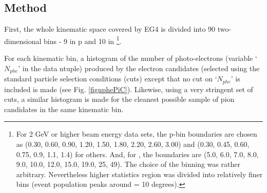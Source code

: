 \subsection{Method}
First, %
the whole kinematic space covered by EG4 is divided into 90 two-dimensional bins - 9 in p and 10 in %
\thns\footnote{For 2 GeV or higher beam energy data sets, the p-bin boundaries are chosen as (0.30, 0.60, 0.90, 1.20, 1.50, 1.80, 2.20, 2.60, 3.00) and (0.30, 0.45, 0.60, 0.75, 0.9, 1.1, 1.4) for others. And, for \thns, the boundaries are (5.0, 6.0, 7.0, 8.0, 9.0, 10.0, 12.0, 15.0, 19.0, 25, 49). The choice of the binning was rather arbitrary. Nevertheless higher statistics region was divided into relatively finer bins (event population peaks around \thns = 10 degrees).}.

For each kinematic bin, a histogram of the number of photo-electrons (variable `$N_{phe}$' in the data ntuple) produced by the electron candidates (selected using the standard particle selection conditions (cuts) except that     no cut on `$N_{phe}$' is included %
is made (see Fig. \ref{fignphePiC}). Likewise, using a very stringent set of cuts, a similar histogram is made for the cleanest possible sample of pion candidates in the same kinematic bin. %


